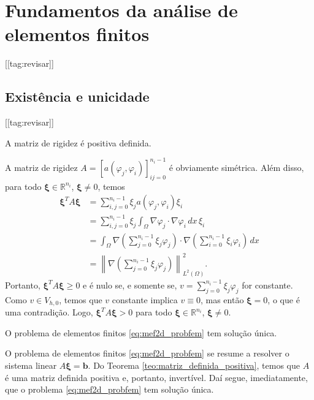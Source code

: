 \section{Fundamentos da análise de elementos finitos}\label{cap_mef2d_sec_funanlef}
[[tag:revisar]]


\subsection{Existência e unicidade}
[[tag:revisar]]


\begin{teo}\label{teo:matriz_definida_positiva}
  A matriz de rigidez é positiva definida.
\end{teo}
\begin{dem}
  A matriz de rigidez $A = [a(\varphi_j,\varphi_i)]_{ij=0}^{n_i-1}$ é obviamente simétrica. Além disso, para todo $\pmb{\xi}\in\mathbb{R}^{n_i}$, $\pmb{\xi}\neq 0$, temos
  \begin{align}
    \pmb{\xi}^TA\pmb{\xi} &= \sum_{i,j=0}^{n_i-1} \xi_ja(\varphi_j,\varphi_i)\xi_i\\
    &= \sum_{i,j=0}^{n_i-1}\xi_j\int_\Omega \nabla \varphi_j\cdot\nabla\varphi_i\,dx\,\xi_i\\
    &= \int_\Omega \nabla \left(\sum_{j=0}^{n_i-1}\xi_j\varphi_j\right)\cdot\nabla \left(\sum_{i=0}^{n_i-1}\xi_i\varphi_i\right)\,dx\\
    &= \left\|\nabla \left(\sum_{j=0}^{n_i-1}\xi_j\varphi_j\right) \right\|_{L^2(\Omega)}^2.
  \end{align}
  Portanto, $\pmb{\xi}^TA\pmb{\xi} \geq 0$ e é nulo se, e somente se, $v = \sum_{j=0}^{n_i-1}\xi_j\varphi_j$ for constante. Como $v\in V_{h,0}$, temos que $v$ constante implica $v\equiv 0$, mas então $\pmb{\xi}=0$, o que é uma contradição. Logo, $\pmb{\xi}^TA\pmb{\xi} > 0$ para todo $\pmb{\xi}\in\mathbb{R}^{n_i}$, $\pmb{\xi}\neq 0$.
\end{dem}

\begin{teo}
  O problema de elementos finitos \eqref{eq:mef2d_probfem} tem solução única.
\end{teo}
\begin{dem}
  O problema de elementos finitos \eqref{eq:mef2d_probfem} se resume a resolver o sistema linear $A\pmb{\xi} = \pmb{b}$. Do Teorema \ref{teo:matriz_definida_positiva}, temos que $A$ é uma matriz definida positiva e, portanto, invertível. Daí segue, imediatamente, que o problema \eqref{eq:mef2d_probfem} tem solução única.
\end{dem}

